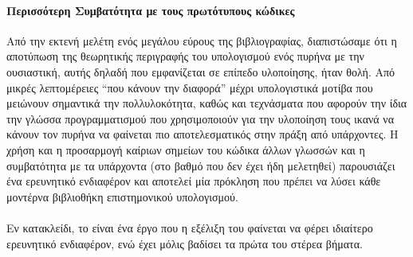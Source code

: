 \paragraph*{Περισσότερη Συμβατότητα με τους πρωτότυπους κώδικες}
Από την εκτενή μελέτη ενός μεγάλου εύρους της βιβλιογραφίας, διαπιστώσαμε ότι η αποτύπωση της θεωρητικής περιγραφής του υπολογισμού ενός πυρήνα με την ουσιαστική, αυτής δηλαδή που εμφανίζεται σε επίπεδο υλοποίησης, ήταν θολή.
Από μικρές λεπτομέρειες ``που κάνουν την διαφορά'' μέχρι υπολογιστικά μοτίβα που μειώνουν σημαντικά την πολλυλοκότητα, καθώς και τεχνάσματα που αφορούν την ίδια την γλώσσα προγραμματισμού που χρησιμοποιούν για την υλοποίηση τους ικανά να κάνουν τον πυρήνα να φαίνεται πιο αποτελεσματικός στην πράξη από υπάρχοντες.
Η χρήση και η προσαρμογή καίριων σημείων του κώδικα άλλων γλωσσών και η συμβατότητα με τα υπάρχοντα (στο βαθμό που δεν έχει ήδη μελετηθεί) παρουσιάζει ένα ερευνητικό ενδιαφέρον και αποτελεί μία πρόκληση που πρέπει να λύσει κάθε μοντέρνα βιβλιοθήκη επιστημονικού υπολογισμού.\\
\paragraph*{}Εν κατακλείδι, το  είναι ένα έργο που η εξέλιξη του φαίνεται να φέρει ιδιαίτερο ερευνητικό ενδιαφέρον, ενώ έχει μόλις βαδίσει τα πρώτα του στέρεα βήματα.
